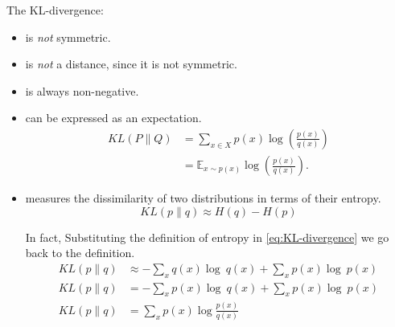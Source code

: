 The KL-divergence:
\begin{itemize}
    \item is \emph{not} symmetric.
    \item is \emph{not} a distance, since it is not symmetric.
    \item is always non-negative.
    \item can be expressed as an expectation.
    \begin{equation}
        \begin{aligned}
            KL (P \| Q) & = \sum_{x \in X} p(x) \log \left( \frac{p(x)}{q(x)} \right) \\
            & = \mathbb{E}_{x \sim p(x)} \log \left( \frac{p(x)}{q(x)} \right).
        \end{aligned}
    \end{equation}
    \item measures the dissimilarity of two distributions in terms of their entropy.
    \begin{equation}\label{eq:KL-divergence}
        KL(p \| q) \approx H(q) - H(p)
    \end{equation} 
    
    In fact, Substituting the definition of entropy in \cref{eq:KL-divergence} we go back to the definition.
    \begin{align}
        KL(p \| q) &\approx - \sum_{x}q(x)\log \ q(x) + \sum_{x}p(x)\log \ p(x) \\
        KL(p \| q) &= - \sum_{x}p(x)\log \ q(x) + \sum_{x}p(x)\log \ p(x) \\
        KL(p \| q) &= \sum_{x}p(x)\log \frac{p(x)}{q(x)}
    \end{align}
\end{itemize}
